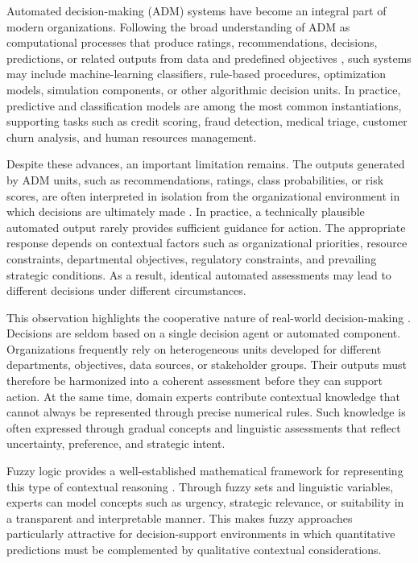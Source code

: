 \documentclass{interact}
\begin{document}
Automated decision-making (ADM) systems have become an integral part of modern organizations. Following the broad understanding of ADM as computational processes that produce ratings, recommendations, decisions, predictions, or related outputs from data and predefined objectives \citep{EIP2022}, such systems may include machine-learning classifiers, rule-based procedures, optimization models, simulation components, or other algorithmic decision units. In practice, predictive and classification models are among the most common instantiations, supporting tasks such as credit scoring, fraud detection, medical triage, customer churn analysis, and human resources management.

Despite these advances, an important limitation remains. The outputs generated by ADM units, such as recommendations, ratings, class probabilities, or risk scores, are often interpreted in isolation from the organizational environment in which decisions are ultimately made \citep{Tariq2024a,Deliu2026}. In practice, a technically plausible automated output rarely provides sufficient guidance for action. The appropriate response depends on contextual factors such as organizational priorities, resource constraints, departmental objectives, regulatory constraints, and prevailing strategic conditions. As a result, identical automated assessments may lead to different decisions under different circumstances.

This observation highlights the cooperative nature of real-world decision-making \citep{Borkotokey2019,Tariq2024a}. Decisions are seldom based on a single decision agent or automated component. Organizations frequently rely on heterogeneous units developed for different departments, objectives, data sources, or stakeholder groups. Their outputs must therefore be harmonized into a coherent assessment before they can support action. At the same time, domain experts contribute contextual knowledge that cannot always be represented through precise numerical rules. Such knowledge is often expressed through gradual concepts and linguistic assessments that reflect uncertainty, preference, and strategic intent.

Fuzzy logic provides a well-established mathematical framework for representing this type of contextual reasoning \citep{PerezCanedo2023,Lamata2020}. Through fuzzy sets and linguistic variables, experts can model concepts such as urgency, strategic relevance, or suitability in a transparent and interpretable manner. This makes fuzzy approaches particularly attractive for decision-support environments in which quantitative predictions must be complemented by qualitative contextual considerations.
\end{document}

